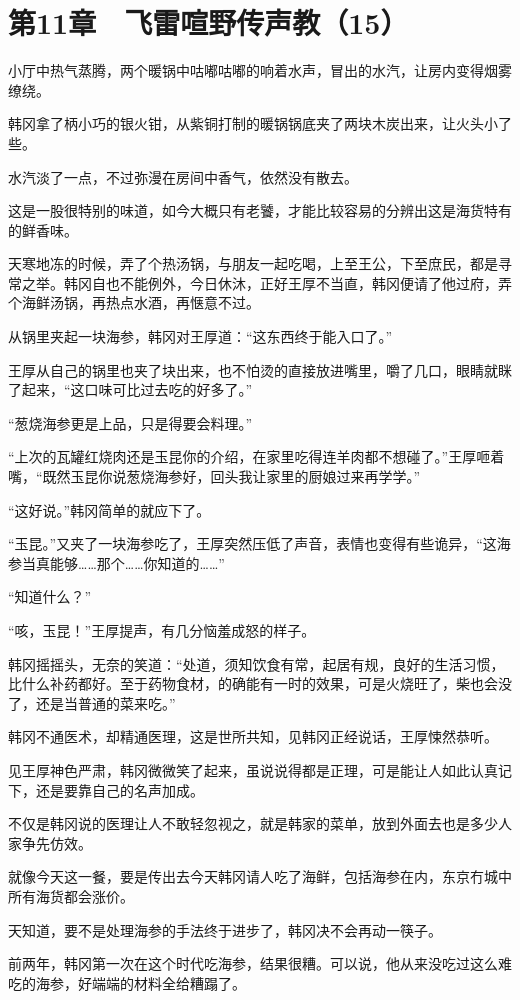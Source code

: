 \section{第11章　飞雷喧野传声教（15）}

小厅中热气蒸腾，两个暖锅中咕嘟咕嘟的响着水声，冒出的水汽，让房内变得烟雾缭绕。

韩冈拿了柄小巧的银火钳，从紫铜打制的暖锅锅底夹了两块木炭出来，让火头小了些。

水汽淡了一点，不过弥漫在房间中香气，依然没有散去。

这是一股很特别的味道，如今大概只有老饕，才能比较容易的分辨出这是海货特有的鲜香味。

天寒地冻的时候，弄了个热汤锅，与朋友一起吃喝，上至王公，下至庶民，都是寻常之举。韩冈自也不能例外，今日休沐，正好王厚不当直，韩冈便请了他过府，弄个海鲜汤锅，再热点水酒，再惬意不过。

从锅里夹起一块海参，韩冈对王厚道：“这东西终于能入口了。”

王厚从自己的锅里也夹了块出来，也不怕烫的直接放进嘴里，嚼了几口，眼睛就眯了起来，“这口味可比过去吃的好多了。”

“葱烧海参更是上品，只是得要会料理。”

“上次的瓦罐红烧肉还是玉昆你的介绍，在家里吃得连羊肉都不想碰了。”王厚咂着嘴，“既然玉昆你说葱烧海参好，回头我让家里的厨娘过来再学学。”

“这好说。”韩冈简单的就应下了。

“玉昆。”又夹了一块海参吃了，王厚突然压低了声音，表情也变得有些诡异，“这海参当真能够……那个……你知道的……”

“知道什么？”

“咳，玉昆！”王厚提声，有几分恼羞成怒的样子。

韩冈摇摇头，无奈的笑道：“处道，须知饮食有常，起居有规，良好的生活习惯，比什么补药都好。至于药物食材，的确能有一时的效果，可是火烧旺了，柴也会没了，还是当普通的菜来吃。”

韩冈不通医术，却精通医理，这是世所共知，见韩冈正经说话，王厚悚然恭听。

见王厚神色严肃，韩冈微微笑了起来，虽说说得都是正理，可是能让人如此认真记下，还是要靠自己的名声加成。

不仅是韩冈说的医理让人不敢轻忽视之，就是韩家的菜单，放到外面去也是多少人家争先仿效。

就像今天这一餐，要是传出去今天韩冈请人吃了海鲜，包括海参在内，东京冇城中所有海货都会涨价。

天知道，要不是处理海参的手法终于进步了，韩冈决不会再动一筷子。

前两年，韩冈第一次在这个时代吃海参，结果很糟。可以说，他从来没吃过这么难吃的海参，好端端的材料全给糟蹋了。

